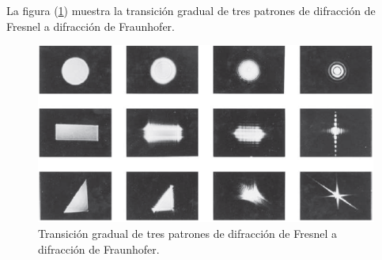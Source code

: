 \documentclass[14pt]{extarticle}
\begin{document}
La figura (\ref{fig:figura_X_20}) muestra la transición gradual de tres patrones de difracción de Fresnel a difracción de Fraunhofer.
\begin{figure}[H]
    \centering
    \includegraphics[scale=1]{Imagenes/Difraccion_20.png}
    \caption{Transición gradual de tres patrones de difracción de Fresnel a difracción de Fraunhofer.}
    \label{fig:figura_X_20}
\end{figure}


 
\end{document}
